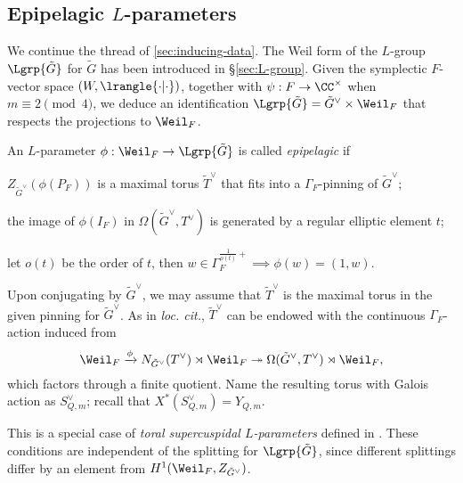 \documentclass[a4paper,10pt]{article}
\begin{document}
\subsection{Epipelagic \texorpdfstring{$L$}{L}-parameters}\label{sec:epipelagic-parameters}
We continue the thread of \ref{sec:inducing-data}. The Weil form of the $L$-group $\Lgrp{\tilde{G}}$ for $\tilde{G}$ has been introduced in \S\ref{sec:L-group}. Given the symplectic $F$-vector space $(W, \lrangle{\cdot|\cdot})$, together with $\psi: F \to \CC^\times$ when $m \equiv 2 \pmod 4$, we deduce an identification $\Lgrp{\tilde{G}} = \tilde{G}^\vee \times \Weil_F$ that respects the projections to $\Weil_F$.

\begin{definition}\label{def:epipelagic-parameter} 
	An $L$-parameter $\phi: \Weil_F \to \Lgrp{\tilde{G}}$ is called \emph{epipelagic} if
	\begin{compactitem}
		\item $Z_{\tilde{G}^\vee}(\phi(P_F))$ is a maximal torus $\tilde{T}^\vee$ that fits into a $\Gamma_F$-pinning of $\tilde{G}^\vee$;
		\item the image of $\phi(I_F)$ in $\Omega(\tilde{G}^\vee, T^\vee)$ is generated by a regular elliptic element $t$;
		\item let $o(t)$ be the order of $t$, then $w \in \Gamma_F^{\frac{1}{o(t)}+} \implies \phi(w) = (1, w)$.
	\end{compactitem}
	Upon conjugating by $\tilde{G}^\vee$, we may assume that $\tilde{T}^\vee$ is the maximal torus in the given pinning for $\tilde{G}^\vee$. As in \textit{loc. cit.}, $\tilde{T}^\vee$ can be endowed with the continuous $\Gamma_F$-action induced from
	\[ \Weil_F \xrightarrow{\phi} N_{\tilde{G}^\vee}(T^\vee) \rtimes \Weil_F \twoheadrightarrow \Omega(\tilde{G}^\vee, T^\vee) \rtimes \Weil_F, \]
	which factors through a finite quotient. Name the resulting torus with Galois action as $S_{Q,m}^\vee$; recall that $X^*(S_{Q,m}^\vee) = Y_{Q,m}$.
\end{definition}
This is a special case of \emph{toral supercuspidal $L$-parameters} defined in \cite[Definition 6.1.1]{Kal16}. These conditions are independent of the splitting for $\Lgrp{\tilde{G}}$, since different splittings differ by an element from $H^1(\Weil_F, Z_{\tilde{G}^\vee})$.
\end{document}
